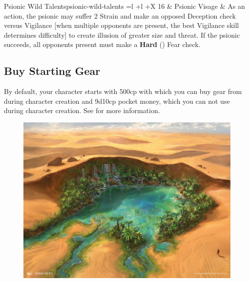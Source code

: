 \begin{multicols}{2}
\begin{table}[!htb]
\begin{GenesysTable}{Psionic Wild Talents}{psionic-wild-talents}{ =l +l +X}
16  & Psionic Visage      & As an action, the psionic may suffer 2 Strain and make an opposed Deception check versus Vigilance
                            [when multiple opponents are present, the best Vigilance skill determines difficulty] to
                            create illusion of greater size and threat. If the psionic succeeds, all opponents present must
                            make a \textbf{Hard} (\difficulty\difficulty\difficulty) Fear check.\\
\end{GenesysTable}
\end{table}

\subsection{Buy Starting Gear}
By default, your character starts with 500cp with which you can buy gear from during character creation and 9d10cp pocket money, which you can not use during character creation.
See  for more information.

\end{multicols}

\FloatBarrier

\begin{figure}[!htb]
\centering
\includegraphics[width=0.8\linewidth]{images/oasis.jpg}
\end{figure}
